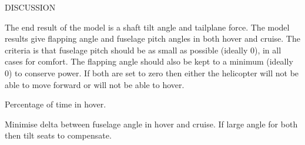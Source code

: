 \documentclass[11pt,a4paper]{article}
\begin{document}









DISCUSSION

The end result of the model is a shaft tilt angle and tailplane force.
The model results give flapping angle and fuselage pitch angles in both hover and cruise.
The criteria is that fuselage pitch should  be as small as possible (ideally 0), in all cases for comfort.
The flapping angle should also be kept to a minimum (ideally 0) to conserve power.
If both are set to zero then either the helicopter will not be able to move forward or will not be able to hover.

Percentage of time in hover. 

Minimise delta between fuselage angle in hover and cruise. If large angle for both then tilt seats to compensate.
\end{document}
